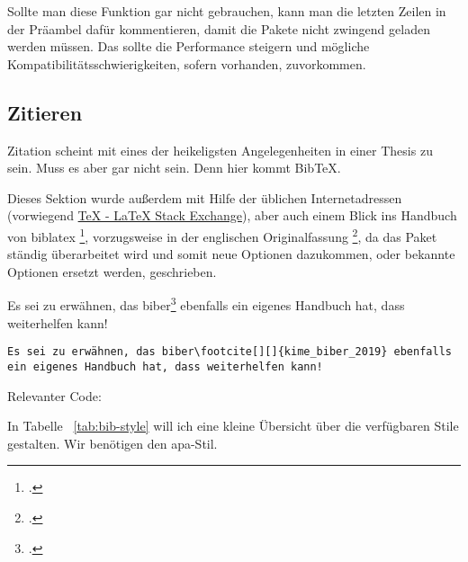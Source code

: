 Sollte man diese Funktion gar nicht gebrauchen, kann man die letzten Zeilen in der Präambel dafür kommentieren, damit die Pakete nicht zwingend geladen werden müssen. Das sollte die Performance steigern und mögliche Kompatibilitätsschwierigkeiten, sofern vorhanden, zuvorkommen.
\subsection{Zitieren}%
Zitation scheint mit eines der heikeligsten Angelegenheiten in einer Thesis zu sein. Muss es aber gar nicht sein. Denn hier kommt Bib\TeX{}.

Dieses Sektion wurde außerdem mit Hilfe der üblichen Internetadressen (vorwiegend \href{https://tex.stackexchange.com/}{TeX - LaTeX Stack Exchange}), aber auch einem Blick ins Handbuch von biblatex \footcite{lehman_biblatex_2017}, vorzugsweise in der englischen Originalfassung \footcite{kime_biblatex_2019}, da das Paket ständig überarbeitet wird und somit neue Optionen dazukommen, oder bekannte Optionen ersetzt werden, geschrieben.

Es sei zu erwähnen, das biber\footcite[][]{kime_biber_2019} ebenfalls ein eigenes Handbuch hat, dass weiterhelfen kann!

\begin{lstlisting}[float=htpb,caption=Das setzen von Zitations \protect\LaTeX{},label=lst:cites]
Es sei zu erwähnen, das biber\footcite[][]{kime_biber_2019} ebenfalls ein eigenes Handbuch hat, dass weiterhelfen kann!
\end{lstlisting}
Relevanter Code:


In Tabelle ~\ref{tab:bib-style} will ich eine kleine Übersicht über die verfügbaren Stile gestalten. Wir benötigen den \gls{apa}-Stil.

